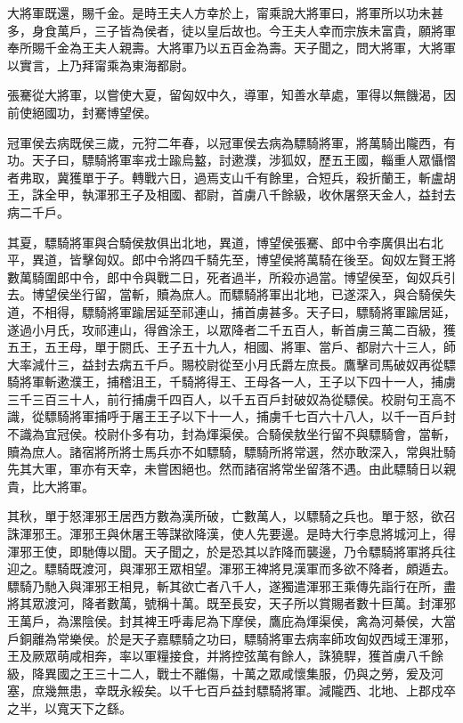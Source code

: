 大將軍既還，賜千金。是時王夫人方幸於上，甯乘說大將軍曰，將軍所以功未甚多，身食萬戶，三子皆為侯者，徒以皇后故也。今王夫人幸而宗族未富貴，願將軍奉所賜千金為王夫人親壽。大將軍乃以五百金為壽。天子聞之，問大將軍，大將軍以實言，上乃拜甯乘為東海都尉。

張騫從大將軍，以嘗使大夏，留匈奴中久，導軍，知善水草處，軍得以無饑渴，因前使絕國功，封騫博望侯。

冠軍侯去病既侯三歲，元狩二年春，以冠軍侯去病為驃騎將軍，將萬騎出隴西，有功。天子曰，驃騎將軍率戎士踰烏盭，討遬濮，涉狐奴，歷五王國，輜重人眾懾慴者弗取，冀獲單于子。轉戰六日，過焉支山千有餘里，合短兵，殺折蘭王，斬盧胡王，誅全甲，執渾邪王子及相國、都尉，首虜八千餘級，收休屠祭天金人，益封去病二千戶。

其夏，驃騎將軍與合騎侯敖俱出北地，異道，博望侯張騫、郎中令李廣俱出右北平，異道，皆擊匈奴。郎中令將四千騎先至，博望侯將萬騎在後至。匈奴左賢王將數萬騎圍郎中令，郎中令與戰二日，死者過半，所殺亦過當。博望侯至，匈奴兵引去。博望侯坐行留，當斬，贖為庶人。而驃騎將軍出北地，已遂深入，與合騎侯失道，不相得，驃騎將軍踰居延至祁連山，捕首虜甚多。天子曰，驃騎將軍踰居延，遂過小月氏，攻祁連山，得酋涂王，以眾降者二千五百人，斬首虜三萬二百級，獲五王，五王母，單于閼氏、王子五十九人，相國、將軍、當戶、都尉六十三人，師大率減什三，益封去病五千戶。賜校尉從至小月氏爵左庶長。鷹擊司馬破奴再從驃騎將軍斬遬濮王，捕稽沮王，千騎將得王、王母各一人，王子以下四十一人，捕虜三千三百三十人，前行捕虜千四百人，以千五百戶封破奴為從驃侯。校尉句王高不識，從驃騎將軍捕呼于屠王王子以下十一人，捕虜千七百六十八人，以千一百戶封不識為宜冠侯。校尉仆多有功，封為煇渠侯。合騎侯敖坐行留不與驃騎會，當斬，贖為庶人。諸宿將所將士馬兵亦不如驃騎，驃騎所將常選，然亦敢深入，常與壯騎先其大軍，軍亦有天幸，未嘗困絕也。然而諸宿將常坐留落不遇。由此驃騎日以親貴，比大將軍。

其秋，單于怒渾邪王居西方數為漢所破，亡數萬人，以驃騎之兵也。單于怒，欲召誅渾邪王。渾邪王與休屠王等謀欲降漢，使人先要邊。是時大行李息將城河上，得渾邪王使，即馳傳以聞。天子聞之，於是恐其以詐降而襲邊，乃令驃騎將軍將兵往迎之。驃騎既渡河，與渾邪王眾相望。渾邪王裨將見漢軍而多欲不降者，頗遁去。驃騎乃馳入與渾邪王相見，斬其欲亡者八千人，遂獨遣渾邪王乘傳先詣行在所，盡將其眾渡河，降者數萬，號稱十萬。既至長安，天子所以賞賜者數十巨萬。封渾邪王萬戶，為漯陰侯。封其裨王呼毒尼為下摩侯，鷹庇為煇渠侯，禽為河綦侯，大當戶銅離為常樂侯。於是天子嘉驃騎之功曰，驃騎將軍去病率師攻匈奴西域王渾邪，王及厥眾萌咸相奔，率以軍糧接食，并將控弦萬有餘人，誅獟駻，獲首虜八千餘級，降異國之王三十二人，戰士不離傷，十萬之眾咸懷集服，仍與之勞，爰及河塞，庶幾無患，幸既永綏矣。以千七百戶益封驃騎將軍。減隴西、北地、上郡戍卒之半，以寬天下之繇。

